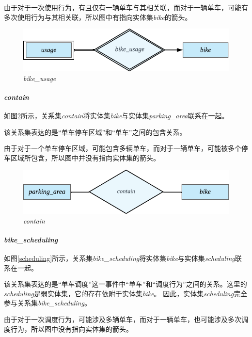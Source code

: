 由于对于一次使用行为，有且仅有一辆单车与其相关联，而对于一辆单车，可能有多次使用行为与其相关联，所以图中有指向实体集\textit{bike}的箭头。
\begin{figure}[!htbp]
    \centering
    \includegraphics[scale=1]{figures/usage.pdf}
    \caption{\textit{bike\_usage}}\label{usage}
\end{figure}

\paragraph{\textit{contain}}
如图\ref{contain}所示，关系集\textit{contain}将实体集\textit{bike}与实体集\textit{parking\_area}联系在一起。

该关系集表达的是“单车停车区域”和“单车”之间的包含关系。

由于对于一个单车停车区域，可能包含多辆单车，而对于一辆单车，可能被多个停车区域所包含，所以图中并没有指向实体集的箭头。
\begin{figure}[!htbp]
    \centering
    \includegraphics[scale=1]{figures/contain.pdf}
    \caption{\textit{contain}}\label{contain}
\end{figure}

\paragraph{\textit{bike\_scheduling}}

如图\ref{scheduling}所示，关系集\textit{bike\_scheduling}将实体集\textit{bike}与实体集\textit{scheduling}联系在一起。

该关系集表达的是“单车调度”这一事件中“单车”和“调度行为”之间的关系。这里的\textit{scheduling}是弱实体集，它的存在依附于实体集\textit{bike}。
因此，实体集\textit{scheduling}完全参与关系集\textit{bike\_scheduling}。

由于对于一次调度行为，可能涉及多辆单车，而对于一辆单车，也可能涉及多次调度行为，所以图中没有指向实体集的箭头。

